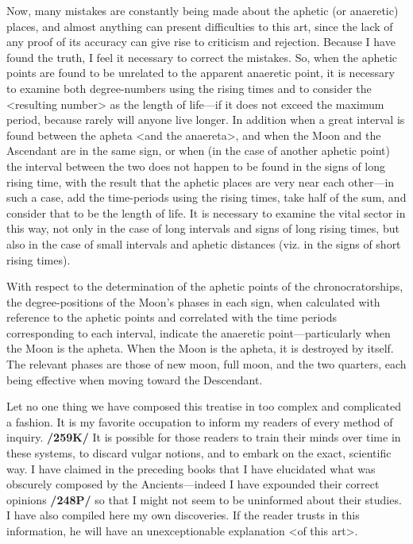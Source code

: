 Now, many mistakes are constantly being made about the aphetic (or anaeretic) places, and almost anything can present difficulties to this art, since the lack of any proof of its accuracy can give rise to criticism and rejection. Because I have found the truth, I feel it necessary to correct the mistakes. So, when the aphetic points are found to be unrelated to the apparent anaeretic point, it is necessary to examine
both degree-numbers using the rising times and to consider the <resulting number> as the length of life—if it does not exceed the maximum period, because rarely will anyone live longer. In addition when a great interval is found between the apheta <and the anaereta>, and when the Moon and the Ascendant are in the
same sign, or when (in the case of another aphetic point) the interval between the two does not happen to be found in the signs of long rising time, with the result that the aphetic places are very near each other—in such a case, add the time-periods using the rising times, take half of the sum, and consider that to be the length of life. It is necessary to examine the vital sector in this way, not only in the case of long intervals and signs of long rising times, but also in the case of small intervals and aphetic distances (viz. in the signs of short rising times).

With respect to the determination of the aphetic points of the chronocratorships, the degree-positions of the Moon’s phases in each sign, when calculated with reference to the aphetic points and correlated with the time periods corresponding to each interval, indicate the anaeretic point—particularly when the Moon is the apheta. When the Moon is the apheta, it is destroyed by itself. The relevant phases are those of new moon, full moon, and the two quarters, each being effective when moving toward the Descendant.

Let no one thing we have composed this treatise in too complex and complicated a fashion. It is my favorite occupation to inform my readers of every method of inquiry. \textbf{/259K/} It is possible for those readers to train their minds over time in these systems, to discard vulgar notions, and to embark on the exact, scientific way. I have claimed in the preceding books that I have elucidated what was obscurely composed by the Ancients—indeed I have expounded their correct opinions \textbf{/248P/} so that I might not seem to be
uninformed about their studies. I have also compiled here my own discoveries. If the reader trusts in this information, he will have an unexceptionable explanation <of this art>. 

